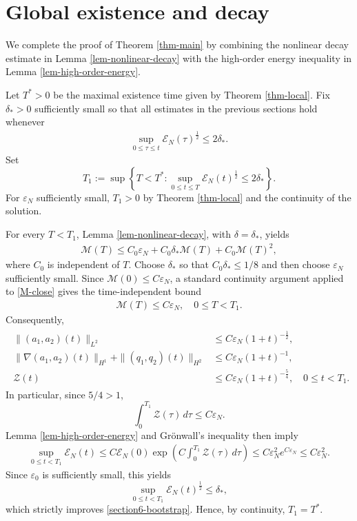 \documentclass[10pt,reqno]{amsart}
\numberwithin{equation}{section}
\begin{document}
%
%
%
%
%
%

\section{Global existence and decay}\label{S6}

We complete the proof of Theorem \ref{thm-main} by combining the nonlinear decay estimate in Lemma \ref{lem-nonlinear-decay} with the high-order energy inequality in Lemma \ref{lem-high-order-energy}.
 
Let $T^*>0$ be the maximal existence time given by
Theorem \ref{thm-local}.  Fix $\delta_*>0$ sufficiently small so that all
estimates in the previous sections hold whenever
\begin{align}\label{section6-bootstrap}
\sup_{0\le \tau\le t}\mathcal E_N(\tau)^{\frac12}\le 2\delta_*.
\end{align}
Set
\[
T_1:=\sup\left\{T<T^*:
\sup_{0\le t\le T}\mathcal E_N(t)^{\frac12}\le 2\delta_*\right\}.
\]
For $\varepsilon_N$ sufficiently small, $T_1>0$ by Theorem \ref{thm-local} and the continuity of the solution.

For every $T<T_1$, Lemma \ref{lem-nonlinear-decay}, with $\delta=\delta_*$, yields
\begin{align}\label{M-close}
\mathcal M(T) \le C_0\varepsilon_N+C_0\delta_*\mathcal M(T) +C_0\mathcal M(T)^2,
\end{align}
where $C_0$ is independent of $T$.  Choose $\delta_*$ so that $C_0\delta_*\le1/8$ and then choose $\varepsilon_N$ sufficiently small. Since $\mathcal M(0)\le C\varepsilon_N$, a standard continuity argument applied to \eqref{M-close} gives the time-independent bound
\begin{align}\label{M-final}
\mathcal M(T)\le C\varepsilon_N, \quad 0\le T<T_1.
\end{align}
Consequently,
\begin{align}\label{final-decay}
\begin{aligned}
\|(a_1,a_2)(t)\|_{L^2} &\le C\varepsilon_N(1+t)^{-\frac12},\\
\|\nabla(a_1,a_2)(t)\|_{H^1} +\|(q_1,q_2)(t)\|_{H^2} &\le C\varepsilon_N(1+t)^{-1},\\
\mathcal Z(t) &\le C\varepsilon_N(1+t)^{-\frac54}, \quad 0\le t<T_1.
\end{aligned}
\end{align}
In particular, since $5/4>1$,
\[%
\int_0^{T_1}\mathcal Z(\tau)\,d\tau\le C\varepsilon_N.
\]%
Lemma \ref{lem-high-order-energy} and Gr\"onwall's inequality then imply
\begin{align}\label{EN-final}
\sup_{0\le t<T_1}\mathcal E_N(t) \le C\mathcal E_N(0) \exp\left(C\int_0^{T_1}\mathcal Z(\tau)\,d\tau\right) \le C\varepsilon_N^2e^{C\varepsilon_N} \le C\varepsilon_N^2.
\end{align}
Since $\varepsilon_0$ is sufficiently small, this yields
\[
\sup_{0\le t<T_1}\mathcal E_N(t)^{\frac12}\le\delta_*,
\]
which strictly improves \eqref{section6-bootstrap}.  Hence, by continuity, $T_1=T^*$.
\end{document}
